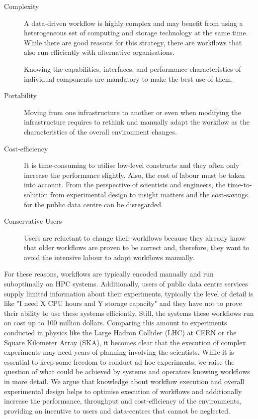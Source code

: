 \documentclass[a4paper]{article}
\begin{document}
{{\begin{description}
  \item[Complexity] A data-driven workflow is highly complex and may benefit from using a heterogeneous set of computing and storage technology at the same time.
  While there are good reasons for this strategy, there are workflows that also run efficiently with alternative organisations.

  Knowing the capabilities, interfaces, and performance characteristics of individual components are mandatory to make the best use of them.

  \item[Portability] Moving from one infrastructure to another or even when modifying the infrastructure requires to rethink and manually adapt the workflow as the characteristics of the overall environment changes.

  \item[Cost-efficiency] It is time-consuming to utilise low-level constructs and they often only increase the performance slightly. Also, the cost of labour must be taken into account.
  From the perspective of scientists and engineers, the time-to-solution from experimental design to insight matters and the cost-savings for the public data centre can be disregarded.

  \item[Conservative Users] Users are reluctant to change their workflows because they already know that older workflows are proven to be correct and, therefore, they want to avoid the intensive labour to adapt workflows manually.

\end{description}

For these reasons, workflows are typically encoded manually and run suboptimally on HPC systems.
Additionally, users of public data centre services supply limited information about their experiments, typically the level of detail is like "I need X CPU hours and Y storage capacity" and they have not to prove their ability to use these systems efficiently.
Still, the systems these workflows run on cost up to 100 million dollars.
Comparing this amount to experiments conducted in physics like the Large Hadron Collider (LHC) at CERN or the Square Kilometer Array (SKA), it becomes clear that the execution of complex experiments may need years of planning involving the scientists.
While it is essential to keep some freedom to conduct ad-hoc experiments, we raise the question of what could be achieved by systems and operators knowing workflows in more detail.
We argue that knowledge about workflow execution and overall experimental design helps to
optimise execution of workflows and additionally increase the performance, throughput and cost-efficiency of the environments, providing an incentive to users and data-centres that cannot be neglected.

}}
\end{document}
